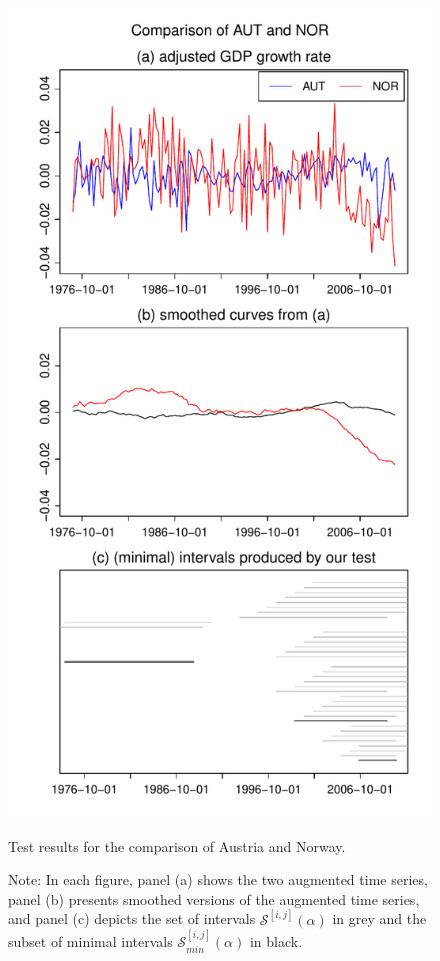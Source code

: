 \documentclass[a4paper,12pt]{article}
\begin{document}
\begin{figure}[b!]
\begin{minipage}[t]{0.49\textwidth}
\includegraphics[width=\textwidth]{output/plots/gdp/AUT_vs_NOR}
\caption{Test results for the comparison of Austria and Norway.}\label{fig:Austria:Norway}
\end{minipage}
\caption*{Note: In each figure, panel (a) shows the two augmented time series, panel (b) presents smoothed versions of the augmented time series, and panel (c) depicts the set of intervals $\mathcal{S}^{[i, j]}(\alpha)$ in grey and the subset of minimal intervals $\mathcal{S}^{[i, j]}_{min}(\alpha)$ in black.}
\end{figure}
\end{document}
